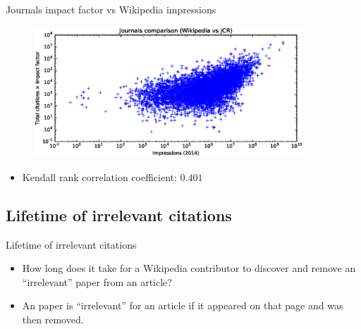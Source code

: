 \documentclass{beamer}
\begin{document}
\begin{frame}{Journals impact factor vs Wikipedia impressions}
    \begin{figure}
    \centering
    \includegraphics[width=0.9\textwidth]{assets/journals_compare_impressions2014}
    \end{figure}

    \begin{itemize}
        \item Kendall rank correlation coefficient: $0.401$
    \end{itemize}
\end{frame}
%

\subsection{Lifetime of irrelevant citations}
\begin{frame}{Lifetime of irrelevant citations}
    \begin{itemize}
        \item How long does it take for a Wikipedia contributor to discover and remove an ``irrelevant'' paper from an article?
        \item An paper is ``irrelevant'' for an article if it appeared on that page and was then removed.
    \end{itemize}
\end{frame}
\end{document}
